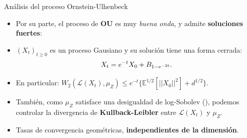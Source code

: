 \documentclass[aspectratio=169,xcolor=dvipsnames, t, spanish]{beamer}
\begin{document}
    \begin{frame}{Análisis del proceso Ornstein-Ulhenbeck}
        \begin{itemize}
            \item Por su parte, el proceso de \textbf{OU} es muy \textit{buena onda}, y admite \textbf{soluciones fuertes}:
            \item $(X_{t})_{t\ge0}$ es un proceso Gausiano y su solución tiene una forma cerrada:
                \[ X_{t}=e^{-t}X_{0}+B_{1-e^{-2t}}. \vspace{-2mm}\]
            \pause
            \item En particular:
            \( W_{2}(\mathcal{L}(X_{t}),\mu_Z)\le e^{-t}\{\mathbb{E}^{1/2}[||X_{0}||^{2}]+d^{1/2}\}. \)
            \item También, como $\mu_Z$ satisface una desigualdad de log-Sobolev (\citet{Bakry2014}),  podemos controlar la divergencia de \textbf{Kullback-Leibler} entre $\mathcal{L}(X_{t})$ y $\mu_Z$.
            \item Tasas de convergencia geométricas, \textbf{independientes de la dimensión}.
        \end{itemize}
    \end{frame}
    
\end{document}
